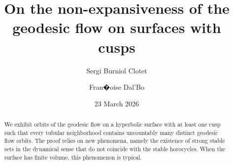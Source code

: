 \documentclass[a4paper,english,reqno]{amsart}
\theoremstyle{definition}
\numberwithin{equation}{section}
\begin{document}
	
	\title[On the non-expansiveness of the geodesic flow]{On the non-expansiveness of the geodesic flow on surfaces with cusps}
	
	
	

	
	\author[ S. Burniol]{ Sergi Burniol Clotet}	
	\address{IMERL, CMAT, Universidad de la Rep�blica, IFUMI, IRL CNRS 2030, Uruguay}
	
	
		\author[F. Dal'Bo]{Fran�oise Dal'Bo}	
	\address{IRMAR, Universit\'e de Rennes, France and IFUMI, IRL CNRS 2030
		}
	
	
	\date{23 March 2026}
	
	
	\dedicatory{}
	
	
	\begin{abstract} 
		
		We exhibit orbits of the geodesic flow on a hyperbolic surface with at least one cusp such that every tubular neighborhood contains uncountably many distinct geodesic flow orbits. The proof relies on new phenomena, namely the existence of strong stable sets in the dynamical sense that do not coincide with the stable horocycles. When the surface has finite volume, this phenomenon is typical.
	\end{abstract}
	
\end{document}
